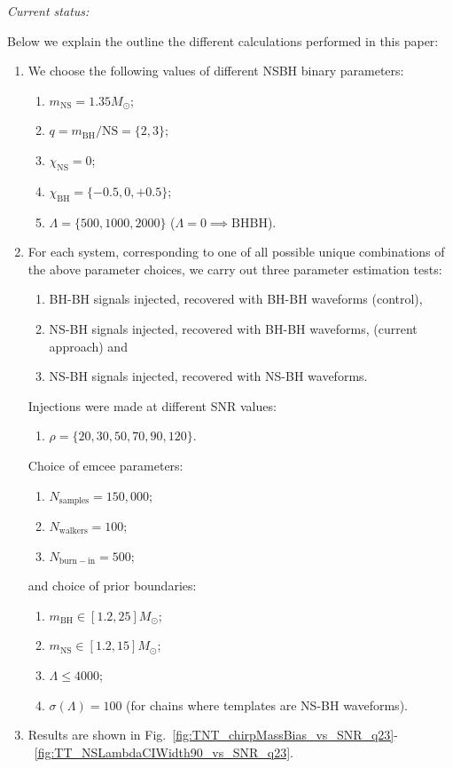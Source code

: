 \documentclass[aps,prd,amsmath,floats,floatfix, twocolumn,
superscriptaddress,nofootinbib,showpacs]{revtex4-1}
\newcommand{\prayush}{\textcolor{red!40!black}}
\begin{document}
\vspace{2cm}

\textit{\prayush{Current status:}}

Below we explain the outline the different calculations performed in this 
paper:

\begin{enumerate}
\item We choose the following values of different NSBH binary parameters:
\begin{enumerate}
\item $m_\mathrm{NS}=1.35M_\odot$;
\item $q=m_\mathrm{BH}/\mathrm{NS}=\{2,3\}$;
\item $\chi_\mathrm{NS}=0$;
\item $\chi_\mathrm{BH}=\{-0.5, 0, +0.5\}$;
\item $\Lambda =\{500,1000,2000\}$ ($\Lambda=0\implies \mathrm{BHBH}$).
\end{enumerate}

\item For each system, corresponding to one of all possible unique combinations
of the above parameter choices, we carry out three parameter estimation tests: 
\begin{enumerate}
\item BH-BH signals injected, recovered with BH-BH waveforms (control),
\item NS-BH signals injected, recovered with BH-BH waveforms, (current approach) and
\item NS-BH signals injected, recovered with NS-BH waveforms.
\end{enumerate}
Injections were made at different SNR values: 
\begin{enumerate}
\item $\rho = \{20, 30, 50, 70, 90, 120\}$.
\end{enumerate}
Choice of emcee parameters:
\begin{enumerate}
\item $N_\mathrm{samples}=150,000$; 
\item $N_\mathrm{walkers}=100$; 
\item $N_\mathrm{burn-in}=500$; 
\end{enumerate}
and choice of prior boundaries:
\begin{enumerate} 
\item $m_\mathrm{BH}\in [1.2, 25]M_\odot$;
\item $m_\mathrm{NS}\in [1.2, 15]M_\odot$;
\item $\Lambda\leq 4000$; 
\item $\sigma\left(\Lambda\right) = 100$ (for chains where templates are NS-BH waveforms).
\end{enumerate}

\item Results are shown in
Fig.~\ref{fig:TNT_chirpMassBias_vs_SNR_q23}-~\ref{fig:TT_NSLambdaCIWidth90_vs_SNR_q23}.

\end{enumerate}
\end{document}
